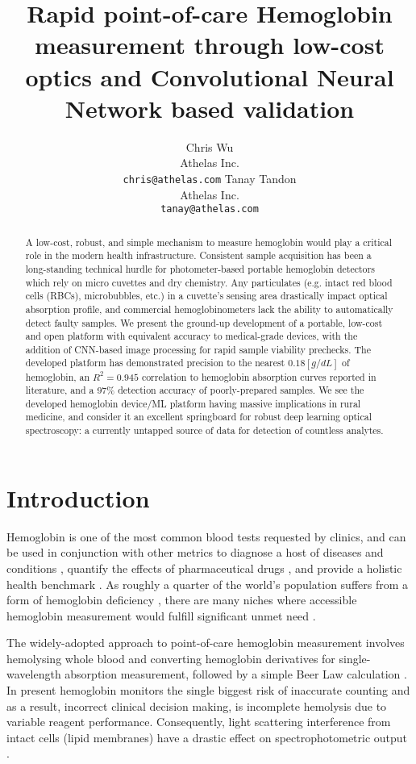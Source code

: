 \documentclass{article}
\title{Rapid point-of-care Hemoglobin measurement through low-cost optics and Convolutional Neural Network based validation}
\author{
  Chris Wu\\
  Athelas Inc. \\
  \texttt{chris@athelas.com}
  \And
  Tanay Tandon\\
  Athelas Inc. \\
  \texttt{tanay@athelas.com}
}
\begin{document}
\maketitle
\begin{abstract}
  A low-cost, robust, and simple mechanism to measure hemoglobin would play a critical role in the modern health infrastructure. Consistent sample acquisition has been a long-standing technical hurdle for photometer-based portable hemoglobin detectors which rely on micro cuvettes and dry chemistry. Any particulates (e.g. intact red blood cells (RBCs), microbubbles, etc.) in a cuvette's sensing area drastically impact optical absorption profile, and commercial hemoglobinometers lack the ability to automatically detect faulty samples. We present the ground-up development of a portable, low-cost and open platform with equivalent accuracy to medical-grade devices, with the addition of CNN-based image processing for rapid sample viability prechecks. The developed platform has demonstrated precision to the nearest $0.18[g/dL]$ of hemoglobin, an \(R^{2} = 0.945\) correlation to hemoglobin absorption curves reported in literature, and a 97\% detection accuracy of poorly-prepared samples. We see the developed hemoglobin device/ML platform having massive implications in rural medicine, and consider it an excellent springboard for robust deep learning optical spectroscopy: a currently untapped source of data for detection of countless analytes.
\end{abstract}
\section{Introduction}
Hemoglobin is one of the most common blood tests requested by clinics, and can be used in conjunction with other metrics to diagnose a host of diseases and conditions \cite{mayoclinic}\cite{biomed}, quantify the effects of pharmaceutical drugs \cite{medlineplus2}, and provide a holistic health benchmark \cite{biomed}. As roughly a quarter of the world’s population suffers from a form of hemoglobin deficiency \cite{who}, there are many niches where accessible hemoglobin measurement would fulfill significant unmet need \cite{cdc}\cite{drugsaging}\cite{biomed}.

The widely-adopted approach to point-of-care hemoglobin measurement involves hemolysing whole blood and converting hemoglobin derivatives for single-wavelength absorption measurement, followed by a simple Beer Law calculation \cite{hemocue}\cite{vanzetti}\cite{oshiro}. In present hemoglobin monitors the single biggest risk of inaccurate counting and as a result, incorrect clinical decision making, is incomplete hemolysis due to variable reagent performance. Consequently, light scattering interference from intact cells (lipid membranes) have a drastic effect on spectrophotometric output \cite{lipemia}.
\end{document}
